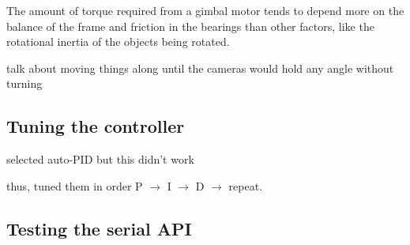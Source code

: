 The amount of torque required from a gimbal motor tends to depend more on the balance of the frame and friction in the bearings than other factors, like the rotational inertia of the objects being rotated.

talk about moving things along until the cameras would hold any angle without turning

\subsection{Tuning the controller}
selected auto-PID but this didn't work

thus, tuned them in order P $\rightarrow$ I $\rightarrow$ D $\rightarrow$ repeat.

\subsection{Testing the serial API}



